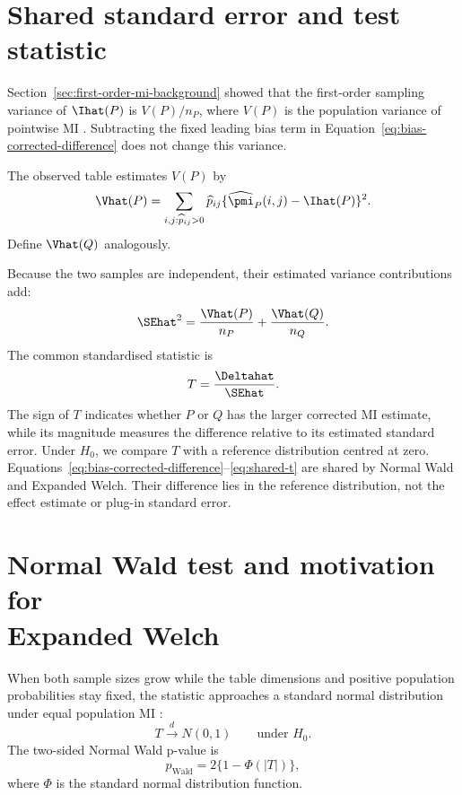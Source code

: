 \section{Shared standard error and test statistic}

Section~\ref{sec:first-order-mi-background} showed that the first-order
sampling variance of \(\Ihat(P)\) is \(V(P)/n_P\), where \(V(P)\) is the
population variance of pointwise MI \citep{moddemeijer1989,brillinger2004}.
Subtracting the fixed leading bias term
in Equation~\eqref{eq:bias-corrected-difference} does not change this
variance.

The observed table estimates \(V(P)\) by
\begin{equation}
  \Vhat(P)
  =\sum_{i,j:\widehat p_{ij}>0}
  \widehat p_{ij}
  \{\widehat\pmi_P(i,j)-\Ihat(P)\}^2.
  \label{eq:estimated-mi-variance}
\end{equation}
Define \(\Vhat(Q)\) analogously.

Because the two samples are independent, their estimated variance
contributions add:
\begin{equation}
  \SEhat^2
  =\frac{\Vhat(P)}{n_P}
  +\frac{\Vhat(Q)}{n_Q}.
  \label{eq:shared-se}
\end{equation}
The common standardised statistic is
\begin{equation}
  T=\frac{\Deltahat}{\SEhat}.
  \label{eq:shared-t}
\end{equation}
The sign of \(T\) indicates whether \(P\) or \(Q\) has the larger
corrected MI estimate, while its magnitude measures the difference
relative to its estimated standard error. Under \(H_0\), we compare \(T\) with a reference distribution
centred at zero.
Equations~\eqref{eq:bias-corrected-difference}--\eqref{eq:shared-t} are shared
by Normal Wald and Expanded Welch. Their difference lies in the reference
distribution, not the effect estimate or plug-in standard error.

\section[Normal Wald test and motivation for Expanded Welch]{Normal Wald test and motivation for\\Expanded Welch}

When both sample sizes grow while the table dimensions and positive
population probabilities stay fixed, the statistic approaches a standard
normal distribution under equal population MI
\citep{wald1943,vanderVaart1998}:
\begin{equation}
  T\xrightarrow{d}N(0,1)
  \qquad\text{under }H_0.
\end{equation}
The two-sided Normal Wald p-value is
\begin{equation}
  p_{\mathrm{Wald}}
  =2\{1-\Phi(|T|)\},
  \label{eq:wald-pvalue}
\end{equation}
where \(\Phi\) is the standard normal distribution function.

